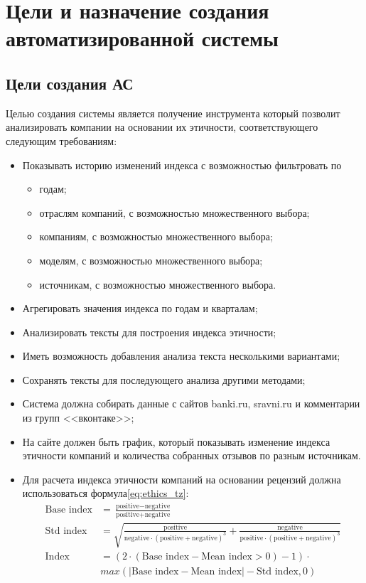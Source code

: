 {\section{Цели и назначение создания автоматизированной системы}

\subsection{Цели создания АС}
Целью создания системы является получение инструмента который позволит анализировать компании на основании их этичности, соответствующего следующим требованиям:
\begin{itemize}
  \item Показывать историю изменений индекса с возможностью фильтровать по
        \begin{itemize}
          \item годам;
          \item отраслям компаний, с возможностью множественного выбора;
          \item компаниям, с возможностью множественного выбора;
          \item моделям, с возможностью множественного выбора;
          \item источникам, с возможностью множественного выбора.
        \end{itemize}
  \item Агрегировать значения индекса по годам и кварталам;
  \item Анализировать тексты для построения индекса этичности;
  \item Иметь возможность добавления анализа текста несколькими вариантами;
  \item Сохранять тексты для последующего анализа другими методами;
  \item Система должна собирать данные с сайтов banki.ru, sravni.ru и комментарии из групп {}<<вконтаке>>{};
  \item На сайте должен быть график, который показывать изменение индекса этичности компаний и количества собранных отзывов по разным источникам.
  \item Для расчета индекса этичности компаний на основании рецензий должна использоваться формула\ref{eq:ethics_tz}:
        \begin{equation}
          \label{eq:ethics_tz}
          \begin{aligned}
            \text{Base index} &= \frac{\text{positive} - \text{negative}}{\text{positive} + \text{negative}} \\
            \text{Std index} &= \sqrt{\frac{\text{positive}}{\text{negative} \cdot (\text{positive} + \text{negative})^{3}} + \frac{\text{negative}}{\text{positive} \cdot (\text{positive} + \text{negative})^{3}}} \\
            \text{Index} &= ({2\cdot({\text{Base index}}-{\text{Mean index}} > 0) - 1})\cdot\\
                              &{max\left(\left|{\text{Base index}}-{\text{Mean index}}\right|-{\text{Std index}}, 0\right)}
          \end{aligned}
        \end{equation}


\end{itemize}}
